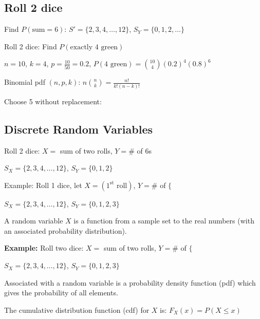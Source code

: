 \subsection{Roll 2 dice}
Find $P(\text{sum} = 6)$: $S' = \{2, 3, 4, \ldots, 12\}$, $S_Y = \{0, 1, 2, \ldots\}$

Roll 2 dice: Find $P(\text{exactly 4 green})$

$n = 10$, $k = 4$, $p = \frac{10}{50} = 0.2$, $P(4 \text{ green}) = \binom{10}{4}(0.2)^4(0.8)^6$

Binomial pdf $(n, p, k)$: $n \binom{n}{k} = \frac{n!}{k!(n-k)!}$

Choose 5 without replacement:

\subsection{Discrete Random Variables}

\begin{example}
Roll 2 dice: $X = $ sum of two rolls, $Y = \#$ of 6s

$S_X = \{2, 3, 4, \ldots, 12\}$, $S_Y = \{0, 1, 2\}$

Example: Roll 1 dice, let $X = (1^{\text{st}} \text{ roll})$, $Y = \#$ of $\{$

$S_X = \{2, 3, 4, \ldots, 12\}$, $S_Y = \{0, 1, 2, 3\}$
\end{example}

\begin{theorem}
A random variable $X$ is a function from a sample set to the real numbers (with an associated probability distribution).
\end{theorem}

\textbf{Example:} Roll two dice: $X = $ sum of two rolls, $Y = \#$ of $\{$

$S_X = \{2, 3, 4, \ldots, 12\}$, $S_Y = \{0, 1, 2, 3\}$

\begin{theorem}
Associated with a random variable is a probability density function (pdf) which gives the probability of all elements.
\end{theorem}

\begin{theorem}
The cumulative distribution function (cdf) for $X$ is: $F_X(x) = P(X \leq x)$
\end{theorem}
